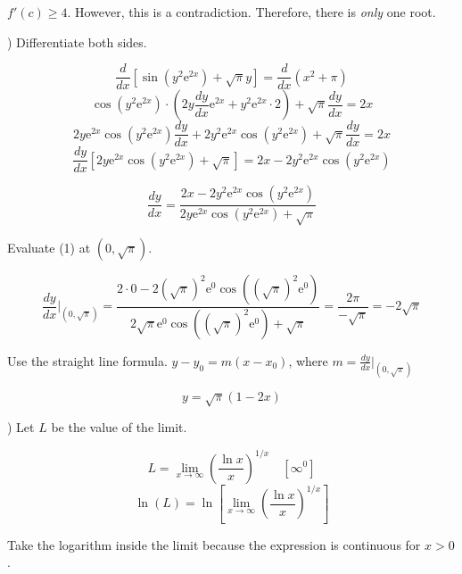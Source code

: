 \documentclass{article}
\begin{document}
\hfill

\noindent $f'(c)\geq4$. However, this is a contradiction. Therefore, there is \textit{only} one root.

\hfill

) Differentiate both sides.

\[\frac d{dx}\left[\sin(y^2\mathrm{e}^{2x})+\sqrt\pi y\right] =\frac {d}{dx} \left(x^2+\pi\right)\]
\[\cos\left(y^2\mathrm{e}^{2x}\right)\cdot\left(2y{\frac{dy}{dx}\mathrm{e}^{2x}}+y^2\mathrm{e}^{2x}\cdot2\right)+\sqrt\pi\frac{dy}{dx}=2x\]
\[2y{\mathrm{e}^{2x}}\cos\left(y^2\mathrm{e}^{2x}\right)\frac{dy}{dx}+2y^2\mathrm{e}^{2x}\cos\left(y^2\mathrm{e}^{2x}\right)+\sqrt\pi\frac{dy}{dx}=2x\]
\[\frac{dy}{dx}\left[2y\mathrm{e}^{2x}\cos\left(y^2\mathrm{e}^{2x}\right)+\sqrt\pi\right]=2x-2y^2{\mathrm{e}^{2x}}\cos\left(y^2\mathrm{e}^{2x}\right)\]

\begin{equation}\frac{dy}{dx}=\frac{2x-2y^2{\mathrm{e}^{2x}}\cos\left(y^2\mathrm{e}^{2x}\right)}{2y\mathrm{e}^{2x}\cos\left(y^2\mathrm{e}^{2x}\right)+\sqrt\pi}\end{equation}

\hfill

\noindent Evaluate (1) at $\left(0, \sqrt\pi\right)$.

\begin{equation*}\frac{dy}{dx}\Bigg|_{\left(0, \sqrt\pi\right)}=\frac{2\cdot0-2\left(\sqrt\pi\right)^2{\mathrm{e}^{0}}\cos\left(\left(\sqrt\pi\right)^2\mathrm{e}^{0}\right)}{2\sqrt\pi\mathrm{e}^{0}\cos\left(\left(\sqrt\pi\right)^2\mathrm{e}^{0}\right)+\sqrt\pi}=\frac{2\pi}{-\sqrt\pi}=-2\sqrt\pi\end{equation*}

\hfill

\noindent Use the straight line formula. $y-y_0 = m(x-x_0)$, where $\displaystyle m=\frac{dy}{dx}\Bigg|_{\left(0, \sqrt\pi\right)}$

\begin{equation*}\boxed{y=\sqrt\pi(1-2x)}\end{equation*}

\hfill

) Let $L$ be the value of the limit.

\[L =\lim_{x\to \infty} \left(\frac{\ln x}x\right)^{1/x}\quad \left[\infty^0\right]\]
\[\ln(L) =\ln\left[\lim_{x\to \infty} \left(\frac{\ln x}x\right)^{1/x}\right]\]

\hfill

\noindent Take the logarithm inside the limit because the expression is continuous for $x>0$.
\end{document}
